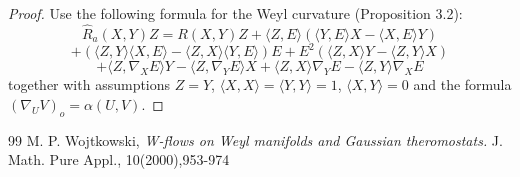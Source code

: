 \documentclass[10pt,a4paper]{amsart}
\begin{document}
\begin{proof} Use the following formula for the Weyl curvature \cite{W} (Proposition 3.2):
$$\widehat{R}_a(X,Y)Z=R(X,Y)Z+\langle Z,E\rangle(\langle Y,E\rangle X-\langle X,E\rangle Y)$$
$$+(\langle Z,Y\rangle \langle X,E\rangle-\langle Z,X\rangle\langle Y,E\rangle)E+E^2(\langle Z,X\rangle Y-\langle Z,Y\rangle X)$$
$$+\langle Z,\nabla_XE\rangle Y-\langle Z,\nabla_YE\rangle X+\langle Z,X\rangle\nabla_YE-\langle Z,Y\rangle\nabla_XE$$ 
  together with assumptions $Z=Y$, $\langle X,X\rangle=\langle Y,Y\rangle=1$, $\langle X,Y\rangle=0$ and the formula $(\nabla_UV)_o=\alpha(U,V)$.
\end{proof}

\begin{thebibliography}{99}
 M. P. Wojtkowski, {\it W-flows on Weyl manifolds and Gaussian theromostats.} J. Math. Pure Appl., 10(2000),953-974
\end{thebibliography}
\end{document}
